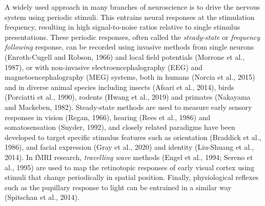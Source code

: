 \documentclass[]{article}
\begin{document}
A widely used approach in many branches of neuroscience is to drive the nervous system using periodic stimuli. This entrains neural responses at the stimulation frequency, resulting in high signal-to-noise ratios relative to single stimulus presentations. These periodic responses, often called the \emph{steady-state} or \emph{frequency following} response, can be recorded using invasive methods from single neurons (Enroth-Cugell and Robson, 1966) and local field potentials (Morrone et al., 1987), or with non-invasive electroencephalography (EEG) and magnetoencephalography (MEG) systems, both in humans (Norcia et al., 2015) and in diverse animal species including insects (Afsari et al., 2014), birds (Porciatti et al., 1990), rodents (Hwang et al., 2019) and primates (Nakayama and Mackeben, 1982). Steady-state methods are used to measure early sensory responses in vision (Regan, 1966), hearing (Rees et al., 1986) and somatosensation (Snyder, 1992), and closely related paradigms have been developed to target specific stimulus features such as orientation (Braddick et al., 1986), and facial expression (Gray et al., 2020) and identity (Liu-Shuang et al., 2014). In fMRI research, \emph{travelling wave} methods (Engel et al., 1994; Sereno et al., 1995) are used to map the retinotopic responses of early visual cortex using stimuli that change periodically in spatial position. Finally, physiological reflexes such as the pupillary response to light can be entrained in a similar way (Spitschan et al., 2014).
\end{document}
